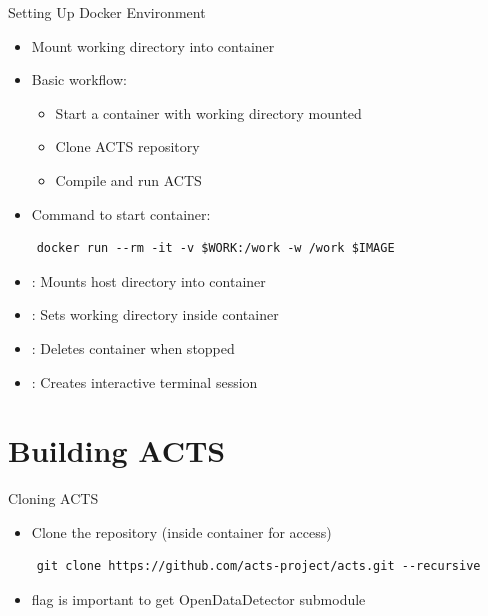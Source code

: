 \documentclass[lualatex,aspectratio=169,t,13pt,dvipsnames]{beamer}
\begin{document}
\begin{frame}[fragile]{Setting Up Docker Environment}
  \begin{itemize}
    \item Mount working directory into container
    \item Basic workflow:
    \begin{itemize}
      \item Start a container with working directory mounted
      \item Clone ACTS repository
      \item Compile and run ACTS
    \end{itemize}
    \item Command to start container:
  \end{itemize}
  
  \begin{verbatim}
    docker run --rm -it -v $WORK:/work -w /work $IMAGE
  \end{verbatim}
  
  \begin{itemize}
    \item {}: Mounts host directory into container
    \item {}: Sets working directory inside container
    \item {}: Deletes container when stopped
    \item {}: Creates interactive terminal session
  \end{itemize}
\end{frame}

\section{Building ACTS}
\begin{frame}[fragile]{Cloning ACTS}
  \begin{itemize}
    \item Clone the repository (inside container for  access)
  \end{itemize}
  
  \begin{verbatim}
    git clone https://github.com/acts-project/acts.git --recursive
  \end{verbatim}
  
  \begin{itemize}
    \item {} flag is important to get OpenDataDetector submodule
  \end{itemize}
\end{frame}
\end{document}
